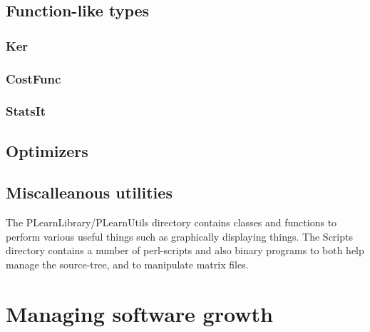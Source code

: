 \documentclass[11pt]{book}
\begin{document}
\section{Function-like types}
\subsection{Ker}
\subsection{CostFunc}
\subsection{StatsIt}
\section{Optimizers}
\label{Optimizer}

%
%
\section{ Miscalleanous utilities}

 The PLearnLibrary/PLearnUtils directory contains classes and
functions to perform various useful things such as graphically
displaying things. The Scripts directory contains a number of
perl-scripts and also binary programs to both help manage the
source-tree, and to manipulate matrix files.


\chapter{Managing software growth}
\end{document}
